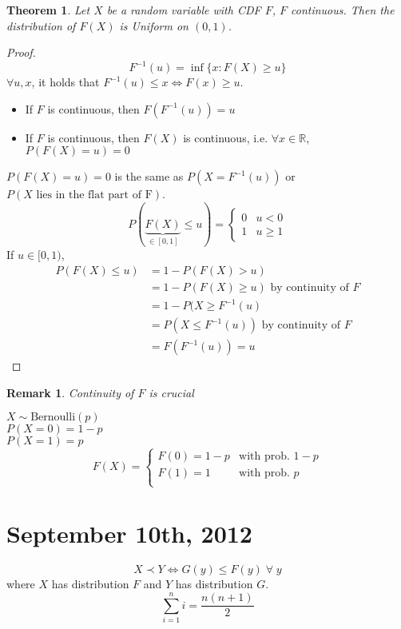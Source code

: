 \documentclass[a4paper,12pt]{amsart}
\newcommand{\sumin}{\sum_{i=1}^n}
\newtheorem{theorem}{Theorem}
\newtheorem{remark}{Remark}
\begin{document}
\begin{theorem}
Let $X$ be a random variable with CDF $F$, $F$ continuous. Then the distribution of $F(X)$ is Uniform on $(0,1)$.
\end{theorem}
\begin{proof}
\[F^{-1}(u)  = \inf\{x: F(X) \geq u\}\]
$\forall u, x$, it holds that $F^{-1}(u) \leq x \Leftrightarrow F(x) \geq u$.
\begin{itemize}
\item If $F$ is continuous, then $F(F^{-1}(u)) = u$
\item If $F$ is continuous, then $F(X)$ is continuous, i.e. $\forall x \in \mathbb{R}$, $P(F(X)=u)=0$
\end{itemize}
$P(F(X)=u)=0$ is the same as $P(X = F^{-1}(u))$ or $P(X \mbox{ lies in the flat part of F})$. 
\[P(\underbrace{F(X)}_{\in [0,1]} \leq u) = 
\begin{cases}
0 & u < 0\\
1 & u \geq 1
\end{cases}\]
If $u \in [0,1)$, 
\begin{align*}
P(F(X) \leq u) &= 1 - P(F(X)>u) \\
&= 1 - P(F(X) \geq u) \mbox{ by continuity of } F\\
&= 1-P(X \geq F^{-1}(u)\\
&= P(X \leq F^{-1}(u))\mbox{ by continuity of } F\\
& = F(F^{-1}(u)) = u
\end{align*}
\end{proof}

\begin{remark}
Continuity of $F$ is crucial
\end{remark}
\noindent
$X \sim \mbox{Bernoulli}(p)$\\
$P(X=0) = 1-p$\\
$P(X=1) = p$\\
\[F(X) = \begin{cases}
F(0) = 1-p & \mbox{with prob. } 1-p\\
F(1) = 1 & \mbox{with prob. } p\\
\end{cases}\]


\section{September 10th, 2012}
\[X \prec Y \Leftrightarrow G(y) \leq F(y) \; \forall \; y\] where $X$ has distribution $F$ and $Y$ has distribution $G$. 
\[\sumin i= \frac{n(n+1)}{2}\]
\end{document}
